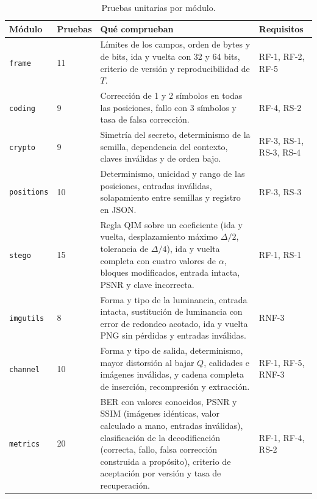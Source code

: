 \documentclass[IB]{TFUOC}%
\begin{document}
\begin{table}[H]
\centering
\scriptsize
\caption{Pruebas unitarias por módulo.}
\label{tab:pruebas}
\begin{tabular}{|p{2.2cm}|p{1.6cm}|p{6.4cm}|p{3.2cm}|}
\hline
\rowcolor{uocnavy}
\color{white}\textbf{Módulo} &
\color{white}\textbf{Pruebas} &
\color{white}\textbf{Qué comprueban} &
\color{white}\textbf{Requisitos} \\
\hline
\texttt{frame} & 11 & Límites de los campos, orden de bytes y de bits, ida y vuelta con 32 y 64 bits, criterio de versión y reproducibilidad de $T$. & RF-1, RF-2, RF-5 \\
\hline
\texttt{coding} & 9 & Corrección de 1 y 2 símbolos en todas las posiciones, fallo con 3 símbolos y tasa de falsa corrección. & RF-4, RS-2 \\
\hline
\texttt{crypto} & 9 & Simetría del secreto, determinismo de la semilla, dependencia del contexto, claves inválidas y de orden bajo. & RF-3, RS-1, RS-3, RS-4 \\
\hline
\texttt{positions} & 10 & Determinismo, unicidad y rango de las posiciones, entradas inválidas, solapamiento entre semillas y registro en JSON. & RF-3, RS-3 \\
\hline
\texttt{stego} & 15 & Regla QIM sobre un coeficiente (ida y vuelta, desplazamiento máximo $\Delta/2$, tolerancia de $\Delta/4$), ida y vuelta completa con cuatro valores de $\alpha$, bloques modificados, entrada intacta, PSNR y clave incorrecta. & RF-1, RS-1 \\
\hline
\texttt{imgutils} & 8 & Forma y tipo de la luminancia, entrada intacta, sustitución de luminancia con error de redondeo acotado, ida y vuelta PNG sin pérdidas y entradas inválidas. & RNF-3 \\
\hline
\texttt{channel} & 10 & Forma y tipo de salida, determinismo, mayor distorsión al bajar $Q$, calidades e imágenes inválidas, y cadena completa de inserción, recompresión y extracción. & RF-1, RF-5, RNF-3 \\
\hline
\texttt{metrics} & 20 & BER con valores conocidos, PSNR y SSIM (imágenes idénticas, valor calculado a mano, entradas inválidas), clasificación de la decodificación (correcta, fallo, falsa corrección construida a propósito), criterio de aceptación por versión y tasa de recuperación. & RF-1, RF-4, RS-2 \\
\hline
\end{tabular}
\end{table}

\end{document}
